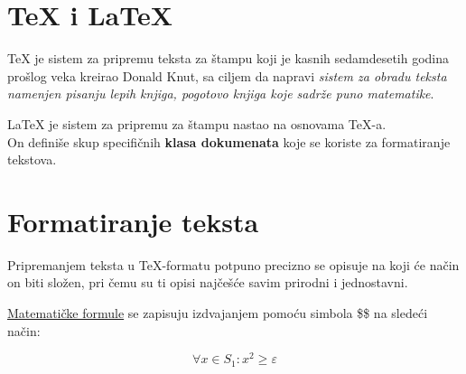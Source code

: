 \documentclass{article}
\begin{document}
\section{\TeX{} i \LaTeX}

\TeX{} je sistem za pripremu teksta za štampu koji je kasnih
sedamdesetih godina prošlog veka kreirao Donald Knut,
sa ciljem
da napravi \emph{sistem za obradu teksta 
namenjen pisanju lepih
knjiga, pogotovo knjiga koje sadrže puno matematike}.

\begin{center}
\LaTeX{} je sistem za pripremu za štampu nastao na osnovama
\TeX-a. \\ On definiše skup specifičnih \textbf{klasa
dokumenata} koje se koriste za formatiranje tekstova.
\end{center}

\section{Formatiranje teksta}

Pripremanjem teksta u \TeX-formatu potpuno precizno se
opisuje na koji će način on biti složen, pri čemu
su ti opisi najčešće savim prirodni i jednostavni.

\underline{Matematičke formule} se zapisuju izdvajanjem
pomoću simbola \$\$ na sledeći način:

$$\forall x \in S_{1}: x^{2} \geq \varepsilon $$

\end{document}
